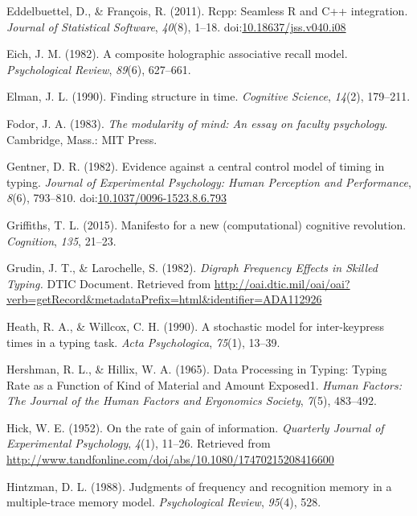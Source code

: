 \documentclass[floatsintext,man]{apa6}
\theoremstyle{definition}
\theoremstyle{definition}
\theoremstyle{definition}
\theoremstyle{remark}
\begin{document}
\hypertarget{ref-R-Rcpp_a}{}
Eddelbuettel, D., \& François, R. (2011). Rcpp: Seamless R and C++
integration. \emph{Journal of Statistical Software}, \emph{40}(8),
1--18.
doi:\href{https://doi.org/10.18637/jss.v040.i08}{10.18637/jss.v040.i08}

\hypertarget{ref-eich_composite_1982}{}
Eich, J. M. (1982). A composite holographic associative recall model.
\emph{Psychological Review}, \emph{89}(6), 627--661.

\hypertarget{ref-elman_finding_1990}{}
Elman, J. L. (1990). Finding structure in time. \emph{Cognitive
Science}, \emph{14}(2), 179--211.

\hypertarget{ref-fodor_modularity_1983}{}
Fodor, J. A. (1983). \emph{The modularity of mind: An essay on faculty
psychology}. Cambridge, Mass.: MIT Press.

\hypertarget{ref-GentnerEvidencecentralcontrol1982}{}
Gentner, D. R. (1982). Evidence against a central control model of
timing in typing. \emph{Journal of Experimental Psychology: Human
Perception and Performance}, \emph{8}(6), 793--810.
doi:\href{https://doi.org/10.1037/0096-1523.8.6.793}{10.1037/0096-1523.8.6.793}

\hypertarget{ref-griffiths_manifesto_2015}{}
Griffiths, T. L. (2015). Manifesto for a new (computational) cognitive
revolution. \emph{Cognition}, \emph{135}, 21--23.

\hypertarget{ref-grudin_digraph_1982}{}
Grudin, J. T., \& Larochelle, S. (1982). \emph{Digraph Frequency Effects
in Skilled Typing.} DTIC Document. Retrieved from
\url{http://oai.dtic.mil/oai/oai?verb=getRecord\&metadataPrefix=html\&identifier=ADA112926}

\hypertarget{ref-heath_stochastic_1990}{}
Heath, R. A., \& Willcox, C. H. (1990). A stochastic model for
inter-keypress times in a typing task. \emph{Acta Psychologica},
\emph{75}(1), 13--39.

\hypertarget{ref-HershmanDataProcessingTyping1965}{}
Hershman, R. L., \& Hillix, W. A. (1965). Data Processing in Typing:
Typing Rate as a Function of Kind of Material and Amount Exposed1.
\emph{Human Factors: The Journal of the Human Factors and Ergonomics
Society}, \emph{7}(5), 483--492.

\hypertarget{ref-hick_rate_1952}{}
Hick, W. E. (1952). On the rate of gain of information. \emph{Quarterly
Journal of Experimental Psychology}, \emph{4}(1), 11--26. Retrieved from
\url{http://www.tandfonline.com/doi/abs/10.1080/17470215208416600}

\hypertarget{ref-hintzman_judgments_1988}{}
Hintzman, D. L. (1988). Judgments of frequency and recognition memory in
a multiple-trace memory model. \emph{Psychological Review},
\emph{95}(4), 528.
\end{document}
